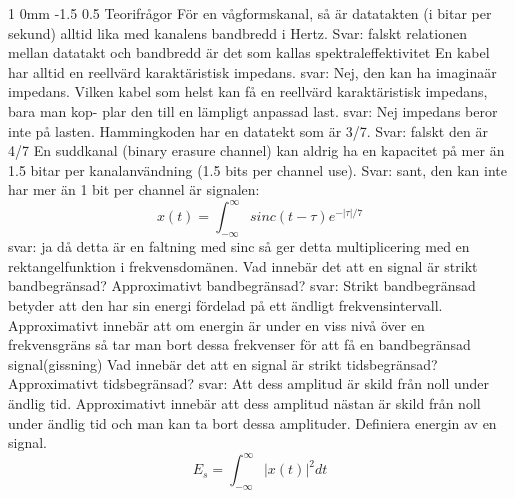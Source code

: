 \documentclass[a4paper,11pt]{article}
\makeatletter
\renewcommand{\section}{\@startsection
   {section}%
   {1}%
   {0mm}%
   {-1.5\baselineskip}%
   {0.5\baselineskip}%
   {\sffamily\bfseries\upshape\normalsize}}%
\makeatother
\begin{document}
 \section{Teorifrågor}
För en vågformskanal, så är datatakten (i bitar per sekund) alltid lika med kanalens
bandbredd i Hertz. Svar: falskt relationen mellan datatakt och bandbredd är det som kallas spektraleffektivitet
\newline
\newline
En kabel har alltid en reellvärd karaktäristisk impedans.
svar: Nej, den kan ha imaginaär impedans.
\newline
\newline
Vilken kabel som helst kan få en reellvärd karaktäristisk impedans, bara man kop-
plar den till en lämpligt anpassad last.
svar: Nej impedans beror inte på lasten. 
\newline
\newline
Hammingkoden har en datatekt som är 3/7. Svar: falskt den är 4/7
\newline
\newline
En suddkanal (binary erasure channel) kan aldrig ha en kapacitet på mer än 1.5
bitar per kanalanvändning (1.5 bits per channel use). Svar: sant, den kan inte har mer än 1 bit per channel
\newline
\newline
är signalen:
$$x(t)=\int_{-\infty}^{\infty}sinc(t-\tau)e^{-|\tau|/7}$$
svar: ja då detta är en faltning med sinc så ger detta multiplicering med en rektangelfunktion i frekvensdomänen.
\newline
\newline
Vad innebär det att en signal är strikt bandbegränsad? Approximativt bandbegränsad? 
svar: Strikt bandbegränsad betyder att den har sin energi fördelad på ett ändligt frekvensintervall.  Approximativt innebär att om energin är under en viss nivå över en frekvensgräns så tar man bort dessa frekvenser för att få en bandbegränsad signal(gissning)
\newline
\newline
Vad innebär det att en signal är strikt tidsbegränsad? Approximativt tidsbegränsad?
svar: Att dess amplitud är skild från noll under ändlig tid. Approximativt innebär att dess amplitud nästan är skild från noll under ändlig tid och man kan ta bort dessa amplituder.
\newline
\newline
Definiera energin av en signal.
$$E_s=\int_{-\infty}^{\infty}{|x(t)|^2dt}$$
\newline
\end{document}
